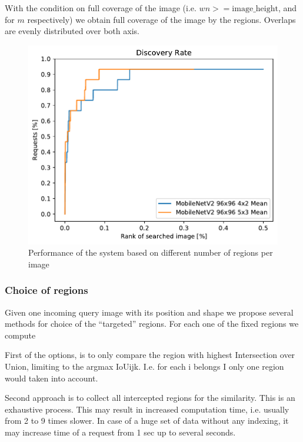 With the condition on full coverage of the image (i.e. \(w n >= \text{image\_height}\), and for $m$ respectively) we obtain full coverage of the image by the regions. Overlaps are evenly distributed over both axis.

\begin{figure}
\centering
\includegraphics[width=\textwidth]{graphs/78f2a977489ac08dddac6f53446b388292306ec95f9dcbc7ca8359fbedfed9b0}
\caption{Performance of the system based on different number of regions per image}
\label{fig:different_number_regions}
\end{figure}

\subsubsection{Choice of regions}

Given one incoming query image with its position and shape we propose several methods for choice of the “targeted” regions. For each one of the fixed regions we compute %

First of the options, is to only compare the region with highest Intersection over Union, limiting to the argmax IoUijk. I.e. for each i belongs I only one region would taken into account.

Second approach is to collect all intercepted regions for the similarity. This is an exhaustive process. This may result in increased computation time, i.e. usually from 2 to 9 times slower. In case of a huge set of data without any indexing, it may increase time of a request from 1 sec up to several seconds.

